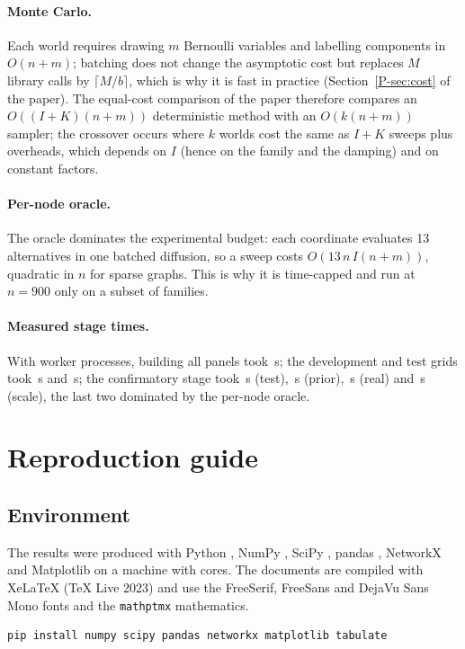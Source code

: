 \documentclass[11pt,a4paper]{article}
\theoremstyle{definition}
\theoremstyle{plain}
\begin{document}
\paragraph{Monte Carlo.} Each world requires drawing $m$ Bernoulli variables and labelling components in $O(n+m)$; batching does not change the asymptotic cost but replaces $M$ library calls by $\lceil M/b\rceil$, which is why it is fast in practice (Section~\ref*{P-sec:cost} of the paper). The equal-cost comparison of the paper therefore compares an $O((I+K)(n+m))$ deterministic method with an $O(k(n+m))$ sampler; the crossover occurs where $k$ worlds cost the same as $I+K$ sweeps plus overheads, which depends on $I$ (hence on the family and the damping) and on constant factors.

\paragraph{Per-node oracle.} The oracle dominates the experimental budget: each coordinate evaluates 13 alternatives in one batched diffusion, so a sweep costs $O(13\,n\,I(n+m))$, quadratic in $n$ for sparse graphs. This is why it is time-capped and run at $n=900$ only on a subset of families.

\paragraph{Measured stage times.} With \NCores{} worker processes, building all panels took \RunBuild\,s; the development and test grids took \RunGridDev\,s and \RunGridTest\,s; the confirmatory stage took \RunConfTest\,s (test), \RunConfPrior\,s (prior), \RunConfReal\,s (real) and \RunConfScale\,s (scale), the last two dominated by the per-node oracle.

\section{Reproduction guide}\label{sec:repro}

\subsection{Environment}

The results were produced with Python \PyVersion, NumPy \NpVersion, SciPy \SpVersion, pandas \PdVersion, NetworkX \NxVersion{} and Matplotlib \MplVersion{} on a machine with \NCores{} cores. The documents are compiled with XeLaTeX (TeX Live 2023) and use the FreeSerif, FreeSans and DejaVu Sans Mono fonts and the \texttt{mathptmx} mathematics.
\begin{verbatim}
pip install numpy scipy pandas networkx matplotlib tabulate
\end{verbatim}
\end{document}
